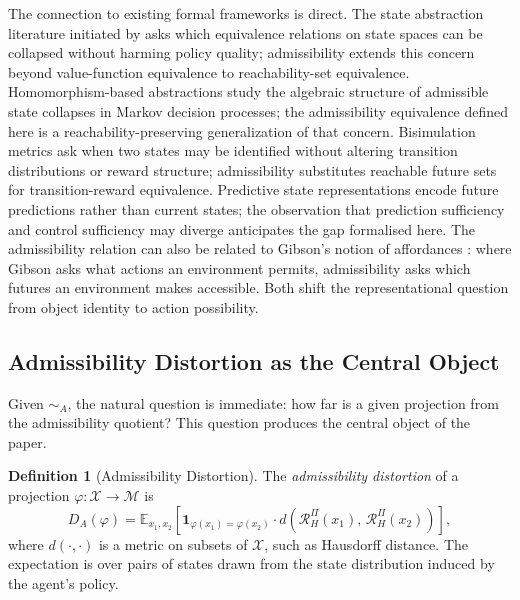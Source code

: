 \documentclass[11pt, a4paper]{article}
\theoremstyle{plain}
\theoremstyle{definition}
\newtheorem{definition}{Definition}
\theoremstyle{remark}
\newcommand{\simA}{\sim_A}
\newcommand{\RHP}{\mathcal{R}_H^\Pi}
\newcommand{\DA}{D_A(\varphi)}
\begin{document}
The connection to existing formal frameworks is direct. The state abstraction
literature initiated by \citet{li2006towards} asks which equivalence relations
on state spaces can be collapsed without harming policy quality; admissibility
extends this concern beyond value-function equivalence to reachability-set
equivalence. Homomorphism-based abstractions \citep{ravindran2004algebraic}
study the algebraic structure of admissible state collapses in Markov decision
processes; the admissibility equivalence defined here is a reachability-preserving
generalization of that concern. Bisimulation metrics \citep{ferns2004metrics,
castro2010bisimulation} ask when two states may be identified without altering
transition distributions or reward structure; admissibility substitutes reachable
future sets for transition-reward equivalence. Predictive state representations
\citep{littman2002predictive} encode future predictions rather than current states;
the observation that prediction sufficiency and control sufficiency may diverge
anticipates the gap formalised here. The admissibility relation can also be
related to Gibson's notion of affordances \citep{gibson1979ecological}: where
Gibson asks what actions an environment permits, admissibility asks which futures
an environment makes accessible. Both shift the representational question from
object identity to action possibility.

\subsection{Admissibility Distortion as the Central Object}

Given $\simA$, the natural question is immediate: how far is a given projection
from the admissibility quotient? This question produces the central object of
the paper.

\begin{definition}[Admissibility Distortion]
\label{def:distortion}
The \emph{admissibility distortion} of a projection $\varphi : \mathcal{X}
\to \mathcal{M}$ is
\begin{equation}
  \DA
  = \mathbb{E}_{x_1, x_2}\!\left[
      \mathbf{1}_{\varphi(x_1) = \varphi(x_2)}
      \cdot d\!\left(\RHP(x_1),\, \RHP(x_2)\right)
    \right],
\end{equation}
where $d(\cdot, \cdot)$ is a metric on subsets of $\mathcal{X}$, such as
Hausdorff distance. The expectation is over pairs of states drawn from the
state distribution induced by the agent's policy.
\end{definition}
\end{document}
